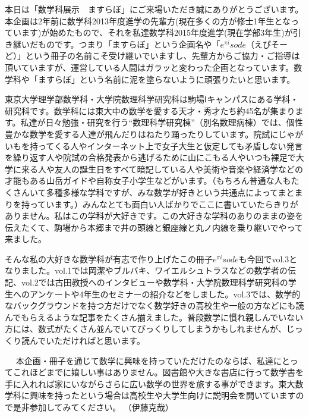 本日は「数学科展示　ますらぼ」にご来場いただき誠にありがとうございます。本企画は2年前に数学科2013年度進学の先輩方(現在多くの方が修士1年生となっています)が始めたもので、それを私達数学科2015年度進学(現在学部3年生)が引き継いだものです。つまり「ますらぼ」という企画名や「$e^{\pi i}sode$（えぴそーど）」という冊子の名前こそ受け継いでいますし、先輩方からご協力・ご指導は頂いていますが、運営している人間はガラッと変わった企画となっています。数学科や「ますらぼ」という名前に泥を塗らないように頑張りたいと思います。\par
東京大学理学部数学科・大学院数理科学研究科は駒場Ⅰキャンパスにある学科・研究科です。数学科には東大中の数学を愛する天才・秀才たち約45名が集まります。私達が日々勉強・研究を行う``数理科学研究棟''（別名数理病棟）では、個性豊かな数学を愛する人達が飛んだりはねたり踊ったりしています。院試にじゃがいもを持ってくる人やインターネット上で女子大生と仮定しても矛盾しない発言を繰り返す人や院試の合格発表から逃げるために山にこもる人やいつも裸足で大学に来る人や友人の誕生日をすべて暗記している人や美術や音楽や経済学などの才能もある山岳ガイドや自称女子小学生などがいます。（もちろん普通な人もたくさんいて多種多様な学科ですが、みな数学が好きという共通点によってまとまりを持っています。）みんなとても面白い人ばかりでここに書いていたらきりがありません。私はこの学科が大好きです。この大好きな学科のありのままの姿を伝えたくて、駒場から本郷まで井の頭線と銀座線と丸ノ内線を乗り継いでやって来ました。\par
そんな私の大好きな数学科が有志で作り上げたこの冊子$e^{\pi i}sode$も今回でvol.3となりました。vol.1では岡潔やブルバキ、ワイエルシュトラスなどの数学者の伝記、vol.2では古田教授へのインタビューや数学科・大学院数理科学研究科の学生へのアンケートや4年生のセミナーの紹介などをしました。vol.3では、数学的なバックグラウンドを持つ方だけでなく数学好きの高校生や一般の方などにも読んでもらえるような記事をたくさん揃えました。普段数学に慣れ親しんでいない方には、数式がたくさん並んでいてびっくりしてしまうかもしれませんが、じっくり読んでいただければと思います。\par　
本企画・冊子を通じて数学に興味を持っていただけたのならば、私達にとってこれほどまでに嬉しい事はありません。図書館や大きな書店に行って数学書を手に入れれば家にいながらさらに広い数学の世界を旅する事ができます。東大数学科に興味を持ったという場合は高校生や大学生向けに説明会を開いていますので是非参加してみてください。
（伊藤克哉）
